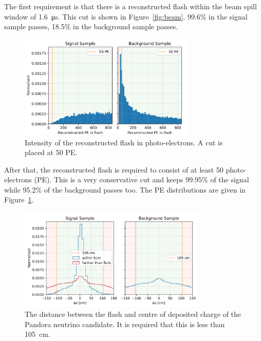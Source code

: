 \documentclass[a4paper]{article}
\begin{document}
The first requirement is that there is a reconstructed flash within the beam spill window of \SI{1.6}{\micro\s}. This cut is shown in Figure~\ref{fig:beam}. 99.6\% in the signal sample passes, 18.5\% in the background sample passes.

\begin{figure}[htbp]
\centering
\includegraphics[width=0.75\textwidth]{PE}
\caption{Intensity of the reconstructed flash in photo-electrons. A cut is placed at 50 PE.} 
\label{fig:PE}
\end{figure}

After that, the reconstructed flash is required to consist of at least 50 photo-electrons (PE). This is a very conservative cut and keeps 99.95\% of the signal while 95.2\% of the background passes too. The PE distributions are given in Figure~\ref{fig:PE}.

\begin{figure}[htbp]
\centering
\includegraphics[width=0.8\textwidth]{zcut}
\caption{The distance between the flash and centre of deposited charge of the Pandora neutrino candidate. It is required that this is less than \SI{105}{\cm}.} 
\label{fig:zcut}
\end{figure}
\end{document}
